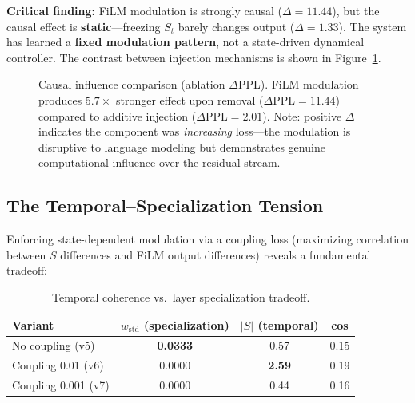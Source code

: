 \documentclass[11pt,a4paper]{article}
\newcommand{\St}{S_t}
\begin{document}
\textbf{Critical finding:} FiLM modulation is strongly causal ($\Delta = 11.44$),
but the causal effect is \textbf{static}---freezing $\St$ barely changes output
($\Delta = 1.33$). The system has learned a \textbf{fixed modulation pattern}, not a
state-driven dynamical controller. The contrast between injection mechanisms is shown in Figure~\ref{fig:causal-comparison}.

\begin{figure}[H]
\centering
{}
\caption{Causal influence comparison (ablation $\Delta$PPL). FiLM modulation produces $5.7\times$ stronger effect upon removal ($\Delta\mathrm{PPL} = 11.44$) compared to additive injection ($\Delta\mathrm{PPL} = 2.01$). Note: positive $\Delta$ indicates the component was \emph{increasing} loss---the modulation is disruptive to language modeling but demonstrates genuine computational influence over the residual stream.}
\label{fig:causal-comparison}
\end{figure}

\subsection{The Temporal--Specialization Tension}

Enforcing state-dependent modulation via a coupling loss (maximizing correlation
between $S$ differences and FiLM output differences) reveals a fundamental tradeoff:

\begin{table}[h]
\centering
\begin{tabular}{lccc}
\toprule
\textbf{Variant} & $w_{\mathrm{std}}$ (specialization) & $|S|$ (temporal) & \textbf{cos} \\
\midrule
No coupling (v5)       & \textbf{0.0333} & 0.57 & 0.15 \\
Coupling 0.01 (v6)     & 0.0000          & \textbf{2.59} & 0.19 \\
Coupling 0.001 (v7)    & 0.0000          & 0.44 & 0.16 \\
\bottomrule
\end{tabular}
\caption{Temporal coherence vs.\ layer specialization tradeoff.}
\end{table}
\end{document}
